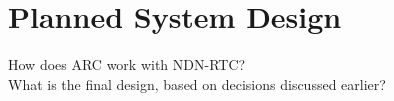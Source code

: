 \section{Planned System Design}
How does ARC work with NDN-RTC? \\
What is the final design, based on decisions discussed earlier?
